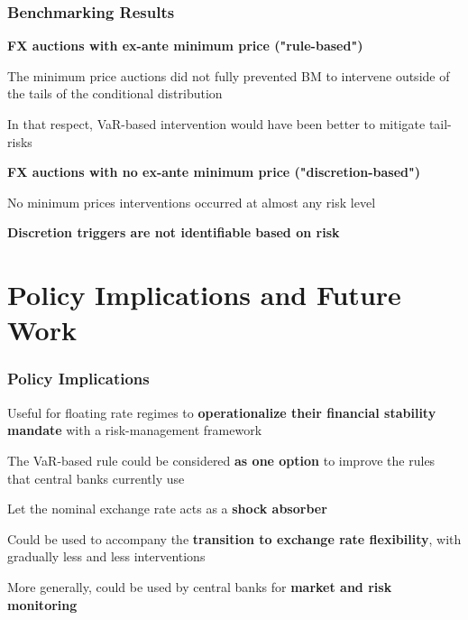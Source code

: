 \documentclass{beamer}
\newenvironment{largeitemize}{\itemize\addtolength{\itemsep}{10pt}}{\enditemize}
\newenvironment{largeenumerate}{\enumerate\addtolength{\itemsep}{10pt}}{\endenumerate}
\begin{document}
\begin{frame}
  \frametitle{Benchmarking Results}
  \begin{largeenumerate}
  \item \textbf{FX auctions with ex-ante minimum price ("rule-based")}
  \begin{largeitemize}
    \item The minimum price auctions did not fully prevented BM to intervene
      outside of the tails of the conditional distribution
    \item In that respect, VaR-based intervention would have been better to
      mitigate tail-risks
    \end{largeitemize}
\item \textbf{FX auctions with no ex-ante minimum price ("discretion-based")}
  \begin{largeitemize}
    \item No minimum prices interventions occurred at almost any risk level
    \item \textbf{Discretion triggers are not identifiable based on risk}
    \end{largeitemize}
  \end{largeenumerate}    
\end{frame}



\section{Policy Implications and Future Work}

\begin{frame}
  \frametitle{Policy Implications}
  \begin{largeitemize}
   \item Useful for floating rate regimes to \textbf{operationalize their financial
     stability mandate} with a risk-management framework
    \item The VaR-based rule could be considered \textbf{as one option} to improve the
      rules that central banks currently use
    \item Let the nominal exchange rate acts as a \textbf{shock absorber}
    \item Could be used to accompany the \textbf{transition to exchange rate
        flexibility}, with gradually less and less interventions
  \item More generally, could be used by central banks for \textbf{market and risk monitoring}
  \end{largeitemize}
\end{frame}
\end{document}
